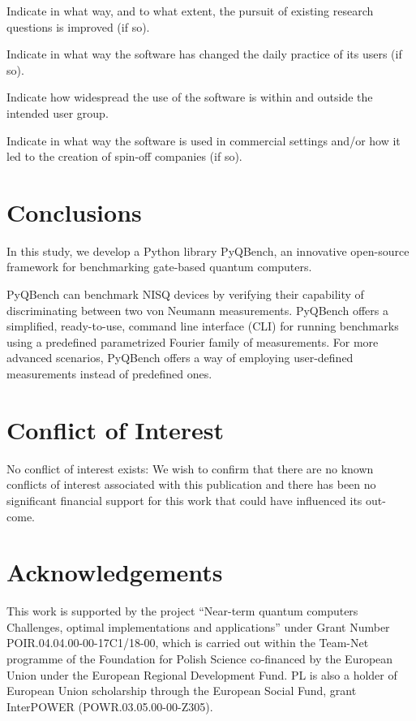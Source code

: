 \documentclass[preprint,12pt, a4paper, dvipsnames]{elsarticle}
\newcommand{\1}{{\rm 1\hspace{-0.9mm}l}}
\begin{document}
Indicate in what way, and to what extent, the pursuit of existing research
questions is improved (if so).

Indicate in what way the software has changed the daily practice of its users
(if so).

Indicate how widespread the use of the software is within and outside the
intended user group.

Indicate in what way the software is used in commercial settings and/or how it
led to the creation of spin-off companies (if so).

\section{Conclusions}
\label{}

In this study, we develop  a Python library PyQBench, an innovative open-source framework for benchmarking
gate-based quantum computers.


PyQBench can benchmark NISQ devices by verifying their capability of
discriminating between two von Neumann measurements. PyQBench offers a simplified, ready-to-use,
command line interface (CLI) for running benchmarks using a predefined parametrized Fourier
family of measurements. For more advanced scenarios, PyQBench offers a way of employing user-defined
measurements instead of predefined ones.
\section{Conflict of Interest}
No conflict of interest exists: We wish to confirm that there are no known
conflicts of interest associated with this publication and there has been no
significant financial support for this work that could have influenced its out-
come.


\section*{Acknowledgements}


This work is  supported by
the project “Near-term quantum computers Challenges, optimal implementations and applications” under Grant Number POIR.04.04.00-00-17C1/18-00, which is carried out within the Team-Net programme of the Foundation for Polish Science co-financed by the European Union under the European Regional Development Fund.
PL is also a holder of European Union scholarship through the European Social Fund,
grant InterPOWER (POWR.03.05.00-00-Z305).
\end{document}
